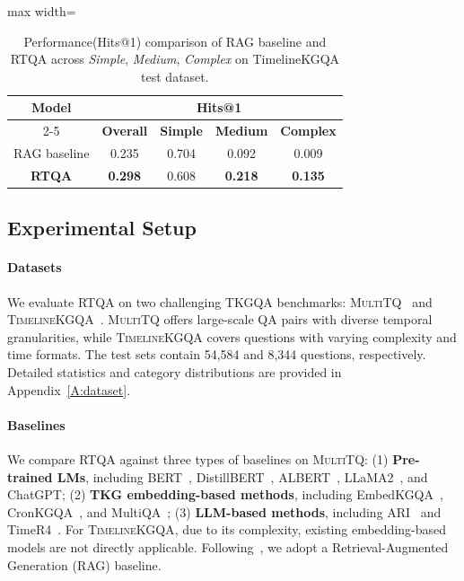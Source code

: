 \documentclass[11pt]{article}
\begin{document}
\begin{table}
\vspace{-0.5em}
\end{table}

\begin{table}[t] %
\caption{Performance(Hits@1) comparison of RAG baseline and RTQA across \textit{Simple}, \textit{Medium}, \textit{Complex} on TimelineKGQA test dataset.}
\label{tab:mainresult_TimelineKGQA}
\vspace{-0.5em}
\centering
\small
\setlength{\tabcolsep}{1pt}
\begin{adjustbox}{max width=\textwidth}
\begin{tabular}{c cccc}
\toprule
\multirow{2}{*}{\textbf{Model}} & \multicolumn{4}{c}{\textbf{Hits@1}} \\
\cmidrule(lr){2-5} 
& \textbf{Overall} & \textbf{Simple} & \textbf{Medium} & \textbf{Complex} \\
\midrule
RAG baseline & 0.235 & 0.704 & 0.092 & 0.009 \\
\textbf{RTQA} & \textbf{0.298} & 0.608 & \textbf{0.218} & \textbf{0.135}  \\
\bottomrule
\end{tabular}
\end{adjustbox}

\vspace{-0.5em}
\end{table}

\subsection{Experimental Setup}
\paragraph{Datasets}
We evaluate RTQA on two challenging TKGQA benchmarks: \textsc{MultiTQ}~\cite{chen2023multi} and \textsc{TimelineKGQA}~\cite{sun2025timelinekgqa}. \textsc{MultiTQ} offers large-scale QA pairs with diverse temporal granularities, while \textsc{TimelineKGQA} covers questions with varying complexity and time formats. The test sets contain 54,584 and 8,344 questions, respectively. Detailed statistics and category distributions are provided in Appendix~\ref{A:dataset}.


\paragraph{Baselines}
We compare RTQA against three types of baselines on \textsc{MultiTQ}: (1) \textbf{Pre-trained LMs}, including BERT~\cite{devlin2019bert}, DistillBERT~\cite{sanh2019distilbert}, ALBERT~\cite{lan2019albert}, LLaMA2~\cite{touvron2023llama}, and ChatGPT; (2) \textbf{TKG embedding-based methods}, including EmbedKGQA~\cite{saxena2020improving}, CronKGQA~\cite{saxena2021question}, and MultiQA~\cite{chen2023multi}; (3) \textbf{LLM-based methods}, including ARI~\cite{chen2023temporal} and TimeR4~\cite{qian2024timer4}.
For \textsc{TimelineKGQA}, due to its complexity, existing embedding-based models are not directly applicable. Following~\cite{sun2025timelinekgqa}, we adopt a Retrieval-Augmented Generation (RAG) baseline.
\end{document}
